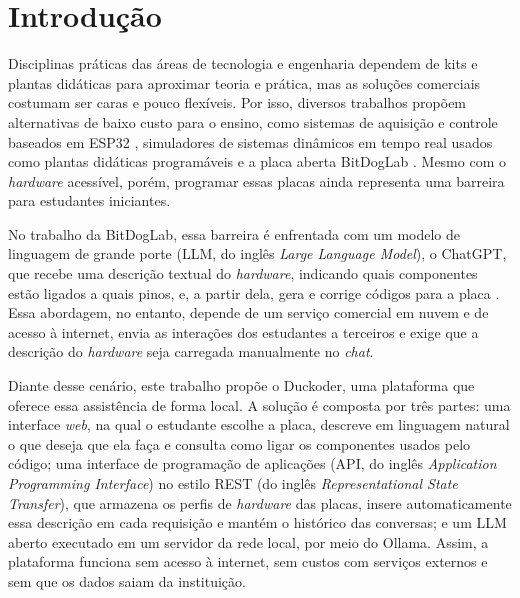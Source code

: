 
\chapter{Introdução}
\label{chap:introduction}

Disciplinas práticas das áreas de tecnologia e engenharia dependem de kits e plantas didáticas para aproximar teoria e prática, mas as soluções comerciais costumam ser caras e pouco flexíveis. Por isso, diversos trabalhos propõem alternativas de baixo custo para o ensino, como sistemas de aquisição e controle baseados em ESP32 \cite{duarte2024}, simuladores de sistemas dinâmicos em tempo real usados como plantas didáticas programáveis \cite{souza2014} e a placa aberta BitDogLab \cite{fruett2024}. Mesmo com o \textit{hardware} acessível, porém, programar essas placas ainda representa uma barreira para estudantes iniciantes.

No trabalho da BitDogLab, essa barreira é enfrentada com um modelo de linguagem de grande porte (LLM, do inglês \textit{Large Language Model}), o ChatGPT, que recebe uma descrição textual do \textit{hardware}, indicando quais componentes estão ligados a quais pinos, e, a partir dela, gera e corrige códigos para a placa \cite{fruett2024}. Essa abordagem, no entanto, depende de um serviço comercial em nuvem e de acesso à internet, envia as interações dos estudantes a terceiros e exige que a descrição do \textit{hardware} seja carregada manualmente no \textit{chat}.

Diante desse cenário, este trabalho propõe o Duckoder, uma plataforma que oferece essa assistência de forma local. A solução é composta por três partes: uma interface \textit{web}, na qual o estudante escolhe a placa, descreve em linguagem natural o que deseja que ela faça e consulta como ligar os componentes usados pelo código; uma interface de programação de aplicações (API, do inglês \textit{Application Programming Interface}) no estilo REST (do inglês \textit{Representational State Transfer}), que armazena os perfis de \textit{hardware} das placas, insere automaticamente essa descrição em cada requisição e mantém o histórico das conversas; e um LLM aberto executado em um servidor da rede local, por meio do Ollama. Assim, a plataforma funciona sem acesso à internet, sem custos com serviços externos e sem que os dados saiam da instituição.

